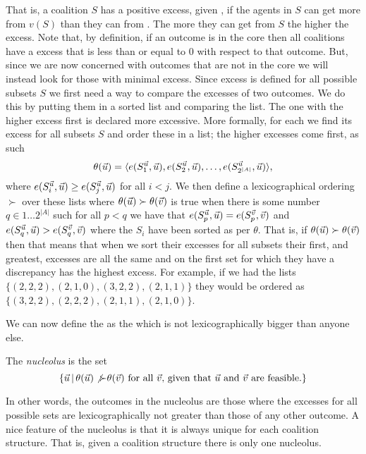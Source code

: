 That is, a coalition $S$ has a positive excess, given \vu{}, if the
agents in $S$ can get more from $v(S)$ than they can from \vu{}. The
more they can get from $S$ the higher the excess. Note that, by
definition, if an outcome \vu{} is in the core then all coalitions
have a excess that is less than or equal to 0 with respect to that
outcome.  But, since we are now concerned with outcomes that are not
in the core we will instead look for those with minimal excess. Since
excess is defined for all possible subsets $S$ we first need a way to
compare the excesses of two outcomes. We do this by putting them in a
sorted list and comparing the list. The one with the higher excess
first is declared more excessive. More formally, for each \vu{} we
find its excess for all subsets $S$ and order these in a list; the
higher excesses come first, as such
\begin{equation}
  \label{eq:gt-8}
  \theta(\vec{u}) = \langle e(S_1^{\vec{u}},\vec{u}), e(S_2^{\vec{u}},\vec{u}),\ldots
  ,e(S_{2^{|A|}}^{\vec{u}},\vec{u}) \rangle,
\end{equation}
where $e(S_i^{\vec{u}}, \vec{u}) \geq e(S_j^{\vec{u}}, \vec{u})$ for all $i < j$.  We
then define a lexicographical ordering $\succ$ over these lists where
$\theta(\vec{u}) \succ \theta(\vec{v})$ is true when there is some number $q
\in 1\ldots 2^{|A|}$ such for all $p < q$ we have that
$e(S_p^{\vec{u}},\vec{u}) = e(S_p^{\vec{v}},\vec{v})$ and $e(S_q^{\vec{u}},\vec{u}) >
e(S_q^{\vec{v}},\vec{v})$ where the $S_i$ have been sorted as per $\theta$.
That is, if $\theta(\vec{u}) \succ \theta(\vec{v})$ then that means that when
we sort their excesses for all subsets their first, and greatest,
excesses are all the same and on the first set for which they have a
discrepancy \vu{} has the highest excess. For example, if we had the
lists $\{(2,2,2), (2,1,0), (3,2,2), (2,1,1)\}$ they would be ordered
as $\{(3,2,2), (2,2,2), (2,1,1), (2,1,0)\}$.

We can now define the  as the \vu{} which is not
lexicographically bigger than anyone else.
\begin{definition}[nucleolus]
  The \emph{nucleolus} is the set
  \[ \{\vec{u}{} \,|\, \theta(\vec{u}) \not{\succ} \theta(\vec{v}) \text{ for all }
  \vec{v} \text{, given that } \vec{u} \text{ and } \vec{v} \text{ are feasible.}\}\]
  
\end{definition}
In other words, the outcomes in the nucleolus are those where the
excesses for all possible sets are lexicographically not greater than
those of any other outcome. A nice feature of the nucleolus is that it
is always unique for each coalition structure. That is, given a
coalition structure there is only one nucleolus.

